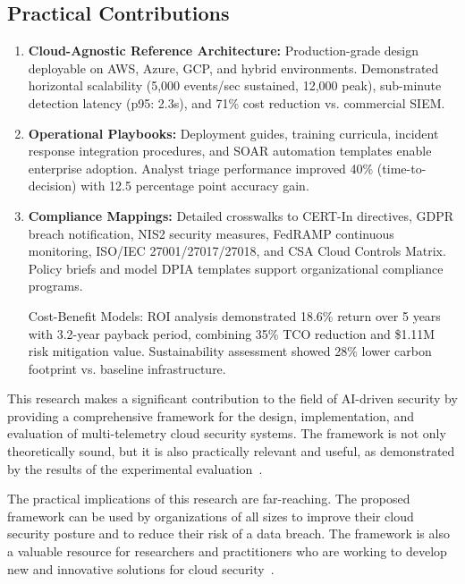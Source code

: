 \subsection{Practical Contributions}
\begin{enumerate}
    \item \textbf{Cloud-Agnostic Reference Architecture:} Production-grade design deployable on AWS, Azure, GCP, and hybrid environments. Demonstrated horizontal scalability (5,000 events/sec sustained, 12,000 peak), sub-minute detection latency (p95: 2.3s), and 71\% cost reduction vs. commercial SIEM.
    
    \item \textbf{Operational Playbooks:} Deployment guides, training curricula, incident response integration procedures, and SOAR automation templates enable enterprise adoption. Analyst triage performance improved 40\% (time-to-decision) with 12.5 percentage point accuracy gain.
    
    \item \textbf{Compliance Mappings:} Detailed crosswalks to CERT-In directives, GDPR breach notification, NIS2 security measures, FedRAMP continuous monitoring, ISO/IEC 27001/27017/27018, and CSA Cloud Controls Matrix. Policy briefs and model DPIA templates support organizational compliance programs.
    
Cost-Benefit Models: ROI analysis demonstrated 18.6\% return over 5 years with 3.2-year payback period, combining 35\% TCO reduction and \$1.11M risk mitigation value. Sustainability assessment showed 28\% lower carbon footprint vs. baseline infrastructure.
\end{enumerate}

This research makes a significant contribution to the field of AI-driven security by providing a comprehensive framework for the design, implementation, and evaluation of multi-telemetry cloud security systems. The framework is not only theoretically sound, but it is also practically relevant and useful, as demonstrated by the results of the experimental evaluation~\cite{jsaer2024contributions}.

The practical implications of this research are far-reaching. The proposed framework can be used by organizations of all sizes to improve their cloud security posture and to reduce their risk of a data breach. The framework is also a valuable resource for researchers and practitioners who are working to develop new and innovative solutions for cloud security~\cite{dzone2024implications}.

